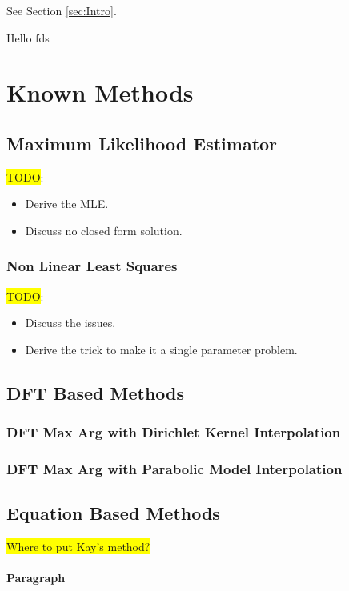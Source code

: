 \documentclass{article}
\newcommand{\marker}[1]{\colorbox{yellow}{#1}}
\begin{document}
\lipsum[4] See Section \ref{sec:Intro}.

Hello  fds

\section{Known Methods}
\label{sec:Methods}

\subsection{Maximum Likelihood Estimator}

\marker{TODO}:
\begin{itemize}
	\item Derive the MLE.
	\item Discuss no closed form solution.
\end{itemize}

\subsubsection{Non Linear Least Squares}

\marker{TODO}:
\begin{itemize}
	\item Discuss the issues.
	\item Derive the trick to make it a single parameter problem.
\end{itemize}

\subsection{DFT Based Methods}

\subsubsection{DFT Max Arg with Dirichlet Kernel Interpolation}

\subsubsection{DFT Max Arg with Parabolic Model Interpolation}

\subsection{Equation Based Methods}

\marker{Where to put Kay's method?}

\paragraph{Paragraph}
\lipsum[7]
\end{document}
